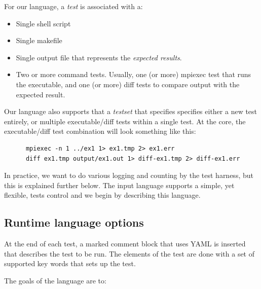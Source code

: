 For our language, a \emph{test} is associated with a:
\begin{itemize}
  \item[] Single shell script
  \item[] Single makefile 
  \item[] Single output file that represents the \emph{expected
        results}.
  \item[] Two or more command tests.  Usually, one (or more) mpiexec
        test that runs the executable, and one (or more) diff tests to
        compare output with the expected result.
\end{itemize}
Our language also supports that a \emph{testset} that specifies
specifies either a new test entirely, or multiple executable/diff tests
within a single test.  At the core, the executable/diff test combination
will look something like this:
%
\begin{lstlisting}
      mpiexec -n 1 ../ex1 1> ex1.tmp 2> ex1.err
      diff ex1.tmp output/ex1.out 1> diff-ex1.tmp 2> diff-ex1.err
\end{lstlisting}

In practice, we want to do various logging and counting by the test
harness, but this is explained further below.  The input language
supports a simple, yet flexible, tests control and we begin by
describing this language.


\subsection{Runtime language options%
  \label{runtime-language-options}%
}

At the end of each test, a marked comment block that uses YAML is
inserted that describes the test to be run.  The elements of the
test are done with a set of supported key words that sets up the test.
%
\begin{description}
\item[{The goals of the language are to:}] \leavevmode \setcounter{listcnt0}{0}

\end{description}

